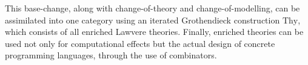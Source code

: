 \documentclass{amsart}
\theoremstyle{definition}
\newcommand{\Set}{\mathsf{Set}}
\newcommand{\V}{\mathsf{V}}
\newcommand{\op}{\mathrm{op}}
\begin{document}
This base-change, along with change-of-theory and change-of-modelling, can be assimilated into one category using an iterated Grothendieck construction $\mathrm{Thy}$, which consists of all enriched Lawvere theories. Finally, enriched theories can be used not only for computational effects but the actual design of concrete programming languages, through the use of combinators.



\end{document}
